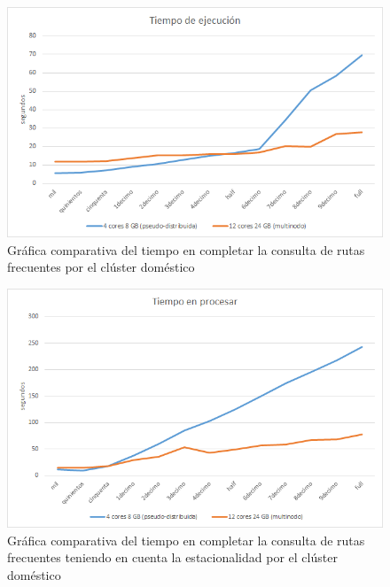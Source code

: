 \begin{figure}[htp!]
	\centering
	\caption{Gráfica comparativa del tiempo en completar la consulta de rutas frecuentes por el clúster doméstico}
	\label{gra:tiemFreqDom}
	\vspace{5pt}
	\includegraphics[scale=0.8]{graficas/tfdom}
\end{figure}
\begin{figure}[htp!]
	\centering
	\caption{Gráfica comparativa del tiempo en completar la consulta de rutas frecuentes teniendo en cuenta la estacionalidad por el clúster doméstico}
	\label{gra:tiemFreqDayDom}
	\vspace{5pt}
	\includegraphics[scale=0.9]{graficas/tfddom}
\end{figure}
